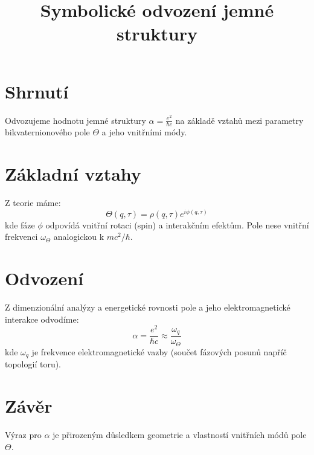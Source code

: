 \documentclass{article}
\title{Symbolické odvození jemné struktury}
\begin{document}
\maketitle

\section*{Shrnutí}
Odvozujeme hodnotu jemné struktury $\alpha = \frac{e^2}{\hbar c}$ na základě vztahů mezi parametry bikvaternionového pole $\Theta$ a jeho vnitřními módy.

\section*{Základní vztahy}
Z teorie máme:
\[
\Theta(q, \tau) = \rho(q, \tau) e^{i \phi(q, \tau)}
\]
kde fáze $\phi$ odpovídá vnitřní rotaci (spin) a interakčním efektům. Pole nese vnitřní frekvenci $\omega_\Theta$ analogickou k $mc^2/\hbar$.

\section*{Odvození}
Z dimenzionální analýzy a energetické rovnosti pole a jeho elektromagnetické interakce odvodíme:
\[
\alpha = \frac{e^2}{\hbar c} \approx \frac{\omega_q}{\omega_\Theta}
\]
kde $\omega_q$ je frekvence elektromagnetické vazby (součet fázových posunů napříč topologií toru).

\section*{Závěr}
Výraz pro $\alpha$ je přirozeným důsledkem geometrie a vlastností vnitřních módů pole $\Theta$.
\end{document}
